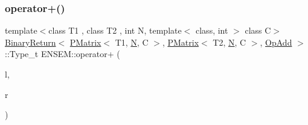 \mbox{\label{group__primmatrix_ga14b22344862e687608f50a8386764f6d}} 
\subsubsection{\texorpdfstring{operator+()}{operator+()}\hspace{0.1cm}{\footnotesize\ttfamily [2/4]}}
{\footnotesize\ttfamily template$<$class T1 , class T2 , int N, template$<$ class, int $>$ class C$>$ \\
\mbox{\hyperlink{structENSEM_1_1BinaryReturn}{Binary\+Return}}$<$ \mbox{\hyperlink{classENSEM_1_1PMatrix}{P\+Matrix}}$<$ T1, \mbox{\hyperlink{operator__name__util_8cc_a7722c8ecbb62d99aee7ce68b1752f337}{N}}, C $>$, \mbox{\hyperlink{classENSEM_1_1PMatrix}{P\+Matrix}}$<$ T2, \mbox{\hyperlink{operator__name__util_8cc_a7722c8ecbb62d99aee7ce68b1752f337}{N}}, C $>$, \mbox{\hyperlink{structENSEM_1_1OpAdd}{Op\+Add}} $>$\+::Type\+\_\+t E\+N\+S\+E\+M\+::operator+ (\begin{DoxyParamCaption}\item[{const \mbox{\hyperlink{classENSEM_1_1PMatrix}{P\+Matrix}}$<$ T1, \mbox{\hyperlink{operator__name__util_8cc_a7722c8ecbb62d99aee7ce68b1752f337}{N}}, C $>$ \&}]{l,  }\item[{const \mbox{\hyperlink{classENSEM_1_1PMatrix}{P\+Matrix}}$<$ T2, \mbox{\hyperlink{operator__name__util_8cc_a7722c8ecbb62d99aee7ce68b1752f337}{N}}, C $>$ \&}]{r }\end{DoxyParamCaption})\hspace{0.3cm}{\ttfamily [inline]}}

\mbox{\label{group__primmatrix_gacd1e2ab4740e640c1aa2862faf4436db}} 
